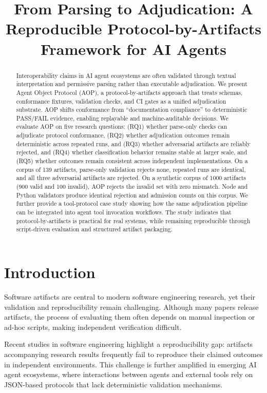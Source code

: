 \documentclass[10pt,conference]{IEEEtran}
\title{From Parsing to Adjudication: A Reproducible Protocol-by-Artifacts Framework for AI Agents}
\begin{document}
\maketitle

\begin{abstract}
Interoperability claims in AI agent ecosystems are often validated through
textual interpretation and permissive parsing rather than executable
adjudication. We present Agent Object Protocol (AOP), a protocol-by-artifacts
approach that treats schemas, conformance fixtures, validation checks, and CI
gates as a unified adjudication substrate. AOP shifts conformance from
``documentation compliance'' to deterministic PASS/FAIL evidence, enabling
replayable and machine-auditable decisions. We evaluate AOP on five research
questions: (RQ1) whether parse-only checks can adjudicate protocol conformance,
(RQ2) whether adjudication outcomes remain deterministic across repeated runs,
and (RQ3) whether adversarial artifacts are reliably rejected, and (RQ4)
whether classification behavior remains stable at larger scale, and (RQ5)
whether outcomes remain consistent across independent implementations. On a
corpus of 139 artifacts, parse-only validation rejects none, repeated runs are
identical, and all three adversarial artifacts are rejected. On a synthetic
corpus of 1000 artifacts (900 valid and 100 invalid), AOP rejects the invalid
set with zero mismatch. Node and Python validators
produce identical rejection and admission counts on this corpus. We further provide a
tool-protocol case study showing how the same adjudication pipeline can be
integrated into agent tool invocation workflows. The study indicates that
protocol-by-artifacts is practical for real systems, while remaining
reproducible through script-driven evaluation and structured artifact packaging.
\end{abstract}

\section{Introduction}

Software artifacts are central to modern software engineering research,
yet their validation and reproducibility remain challenging.
Although many papers release artifacts, the process of evaluating them
often depends on manual inspection or ad-hoc scripts, making
independent verification difficult.

Recent studies in software engineering highlight a reproducibility gap:
artifacts accompanying research results frequently fail to reproduce
their claimed outcomes in independent environments.
This challenge is further amplified in emerging AI agent ecosystems,
where interactions between agents and external tools rely on
JSON-based protocols that lack deterministic validation mechanisms.
\end{document}

